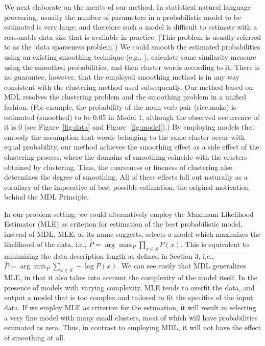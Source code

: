 We next elaborate on the merits of our method. In statistical natural
language processing, usually the number of parameters in a
probabilistic model to be estimated is very large, and therefore such
a model is difficult to estimate with a reasonable data size that is
available in practice. (This problem is usually referred to as the
`data sparseness problem.') We could smooth the estimated
probabilities using an existing smoothing technique (e.g.,
\cite{Dagan92,Gale90}), calculate some similarity measure using the
smoothed probabilities, and then cluster words according to it. There
is no guarantee, however, that the employed smoothing method is in any
way consistent with the clustering method used subsequently. Our
method based on MDL resolves the clustering problem and the smoothing
problem in a unified fashion. (For example, the probability of the
noun verb pair (rice,make) is estimated (smoothed) to be $0.05$ in
Model 1, although the observed occurrence of it is $0$ (see
Figure~\ref{fig:data} and Figure~\ref{fig:model}).) By employing
models that embody the assumption that words belonging to the same
cluster occur with equal probability, our method achieves the
smoothing effect as a side effect of the clustering process, where the
domains of smoothing coincide with the clusters obtained by
clustering. Thus, the coarseness or fineness of clustering also
determines the degree of smoothing. All of these effects fall out
naturally as a corollary of the imperative of best possible
estimation, the original motivation behind the MDL Principle.

In our problem setting, we could alternatively employ the Maximum
Likelihood Estimator (MLE) as criterion for estimation of the best
probabilistic model, instead of MDL. MLE, as its name suggests,
selects a model which maximizes the likelihood of the data, i.e.,
$\hat{P} = \arg\max_{P} \prod_{x \in S} P(x)$. This is equivalent to
minimizing the data description length as defined in Section 3,
i.e., $\hat{P} = \arg\min_{P} \sum_{x \in S} - \log P(x)$. We can see
easily that MDL generalizes MLE, in that it also takes into account
the complexity of the model itself. In the presence of models with
varying complexity, MLE tends to overfit the data, and output a model
that is too complex and tailored to fit the specifics of the input
data. If we employ MLE as criterion for the estimation, it will result
in selecting a very fine model with many small clusters, most of which
will have probabilities estimated as zero. Thus, in contrast to
employing MDL, it will not have the effect of smoothing at all.

